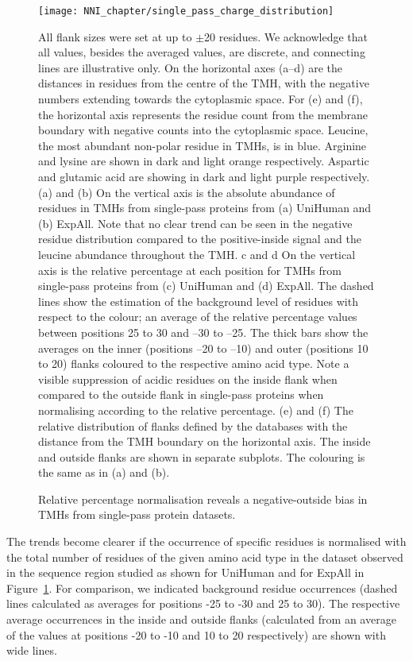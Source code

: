 \begin{figure}[!p]
\centering
\texttt{[image: NNI\_chapter/single\_pass\_charge\_distribution]}
\caption{Relative percentage normalisation reveals a negative-outside bias in TMHs from single-pass protein datasets.}

\medskip
\small
All flank sizes were set at up to $\pm$20 residues. We acknowledge that all values, besides the averaged values, are discrete, and connecting lines are illustrative only. On the horizontal axes (a–d) are the distances in residues from the centre of the TMH, with the negative numbers extending towards the cytoplasmic space. For (e) and (f), the horizontal axis represents the residue count from the membrane boundary with negative counts into the cytoplasmic space. Leucine, the most abundant non-polar residue in TMHs, is in blue. Arginine and lysine are shown in dark and light orange respectively. Aspartic and glutamic acid are showing in dark and light purple respectively. (a) and (b) On the vertical axis is the absolute abundance of residues in TMHs from single-pass proteins from (a) UniHuman and (b) ExpAll. Note that no clear trend can be seen in the negative residue distribution compared to the positive-inside signal and the leucine abundance throughout the TMH. c and d On the vertical axis is the relative percentage at each position for TMHs from single-pass proteins from (c) UniHuman and (d) ExpAll. The dashed lines show the estimation of the background level of residues with respect to the colour; an average of the relative percentage values between positions 25 to 30 and –30 to –25. The thick bars show the averages on the inner (positions –20 to –10) and outer (positions 10 to 20) flanks coloured to the respective amino acid type. Note a visible suppression of acidic residues on the inside flank when compared to the outside flank in single-pass proteins when normalising according to the relative percentage. (e) and (f) The relative distribution of flanks defined by the databases with the distance from the TMH boundary on the horizontal axis. The inside and outside flanks are shown in separate subplots. The colouring is the same as in (a) and (b).
\label{fig:single_pass_charge_distribution}
\end{figure}

The trends become clearer if the occurrence of specific residues is normalised with the total number of residues of the given amino acid type in the dataset observed in the sequence region studied as shown for UniHuman and for ExpAll in Figure~\ref{fig:single_pass_charge_distribution}. For comparison, we indicated background residue occurrences (dashed lines calculated as averages for positions -25 to -30 and 25 to 30). The respective average occurrences in the inside and outside flanks (calculated from an average of the values at positions -20 to -10 and 10 to 20 respectively) are shown with wide lines.

